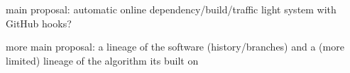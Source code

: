 \documentclass[conference]{IEEEtran}
\begin{document}
main proposal: automatic online dependency/build/traffic light system
with GitHub hooks?

more main proposal: a lineage of the software (history/branches) and a
(more limited) lineage of the algorithm its built on





\end{document}
